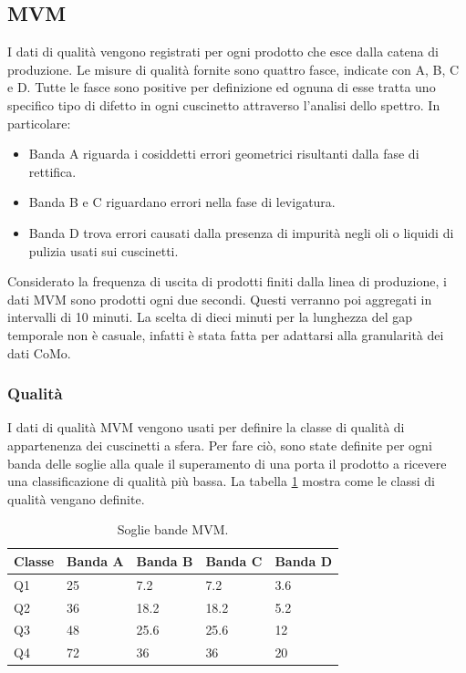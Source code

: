\subsection{MVM}
I dati di qualità vengono registrati per ogni prodotto che esce dalla catena di produzione.
Le misure di qualità fornite sono quattro fasce, indicate con A, B, C e D.
Tutte le fasce sono positive per definizione ed ognuna di esse tratta uno specifico tipo di difetto in ogni cuscinetto attraverso l'analisi dello spettro. In particolare:
\begin{itemize}
	\item Banda A riguarda i cosiddetti errori geometrici risultanti dalla fase di rettifica.
	\item Banda B e C riguardano errori nella fase di levigatura.
	\item Banda D trova errori causati dalla presenza di impurità negli oli o liquidi di pulizia usati sui cuscinetti.
\end{itemize}

Considerato la frequenza di uscita di prodotti finiti dalla linea di produzione, i dati MVM sono prodotti ogni due secondi. Questi verranno poi aggregati in intervalli di 10 minuti. La scelta di dieci minuti per la lunghezza del gap temporale non è casuale, infatti è stata fatta per adattarsi alla granularità dei dati CoMo.

\subsubsection{Qualità}
I dati di qualità MVM vengono usati per definire la classe di qualità di appartenenza dei cuscinetti a sfera. Per fare ciò, sono state definite per ogni banda delle soglie alla quale il superamento di una porta il prodotto a ricevere una classificazione di qualità più bassa.
La tabella \ref{mvm-soglie} mostra come le classi di qualità vengano definite.

\begin{table}
	\caption{\label{mvm-soglie}Soglie bande MVM.}
	\centering
	\begin{tabular}{|l|l|l|l|l|}
		\hline
		Classe & \multicolumn{1}{c|}{Banda A} & \multicolumn{1}{c|}{Banda B} & \multicolumn{1}{c|}{Banda C} & \multicolumn{1}{c|}{Banda D} \\ \hline
		Q1     & 25                           & 7.2                          & 7.2                          & 3.6                          \\ \hline
		Q2     & 36                           & 18.2                         & 18.2                         & 5.2                          \\ \hline
		Q3     & 48                           & 25.6                         & 25.6                         & 12                           \\ \hline
		Q4     & 72                           & 36                           & 36                           & 20                           \\ \hline
	\end{tabular}
\end{table}

